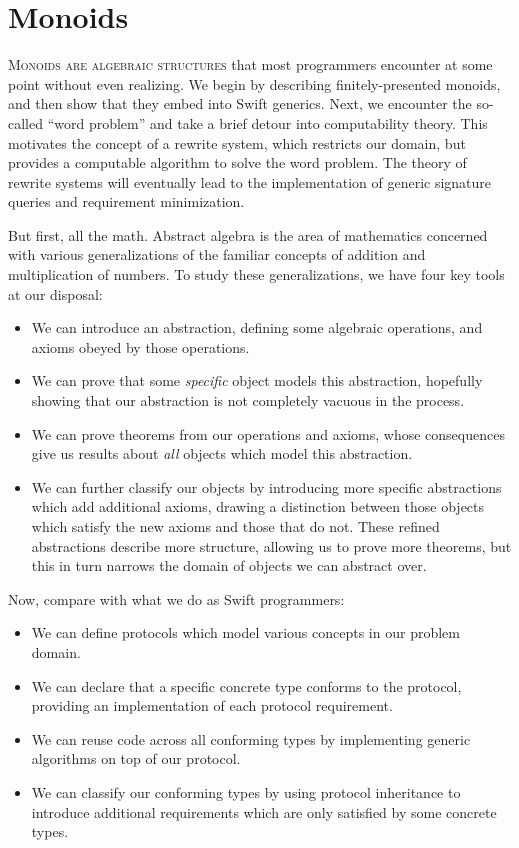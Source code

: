 \documentclass[../generics]{subfiles}
\begin{document}
\chapter{Monoids}\label{monoids}

\lettrine{M}{onoids are algebraic structures} that most programmers encounter at some point without even realizing. We begin by describing finitely-presented monoids, and then show that they embed into Swift generics. Next, we encounter the so-called ``word problem'' and take a brief detour into computability theory. This motivates the concept of a rewrite system, which restricts our domain, but provides a computable algorithm to solve the word problem. The theory of rewrite systems will eventually lead to the implementation of generic signature queries and requirement minimization.

But first, all the math. Abstract algebra is the area of mathematics concerned with various generalizations of the familiar concepts of addition and multiplication of numbers. To study these generalizations, we have four key tools at our disposal:
\begin{itemize}
\item We can introduce an abstraction, defining some algebraic operations, and axioms obeyed by those operations.
\item We can prove that some \emph{specific} object models this abstraction, hopefully showing that our abstraction is not completely vacuous in the process.
\item We can prove theorems from our operations and axioms, whose consequences give us results about \emph{all} objects which model this abstraction.
\item We can further classify our objects by introducing more specific abstractions which add additional axioms, drawing a distinction between those objects which satisfy the new axioms and those that do not. These refined abstractions describe more structure, allowing us to prove more theorems, but this in turn narrows the domain of objects we can abstract over.
\end{itemize}
Now, compare with what we do as Swift programmers:
\begin{itemize}
\item We can define protocols which model various concepts in our problem domain.
\item We can declare that a specific concrete type conforms to the protocol, providing an implementation of each protocol requirement.
\item We can reuse code across all conforming types by implementing generic algorithms on top of our protocol.
\item We can classify our conforming types by using protocol inheritance to introduce additional requirements which are only satisfied by some concrete types.
\end{itemize}
\end{document}
